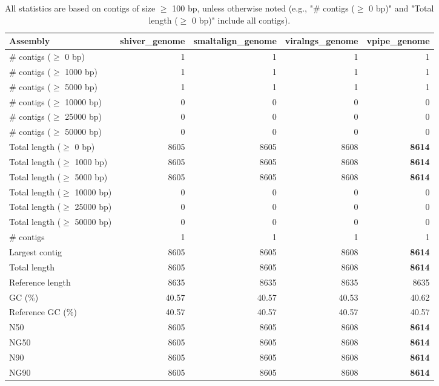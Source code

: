 \documentclass[12pt,a4paper]{article}
\begin{document}
\begin{table}[ht]
\begin{center}
\caption{All statistics are based on contigs of size $\geq$ 100 bp, unless otherwise noted (e.g., "\# contigs ($\geq$ 0 bp)" and "Total length ($\geq$ 0 bp)" include all contigs).}
\begin{tabular}{|l*{4}{|r}|}
\hline
Assembly & shiver\_genome & smaltalign\_genome & viralngs\_genome & vpipe\_genome \\ \hline
\# contigs ($\geq$ 0 bp) & 1 & 1 & 1 & 1 \\ \hline
\# contigs ($\geq$ 1000 bp) & 1 & 1 & 1 & 1 \\ \hline
\# contigs ($\geq$ 5000 bp) & 1 & 1 & 1 & 1 \\ \hline
\# contigs ($\geq$ 10000 bp) & 0 & 0 & 0 & 0 \\ \hline
\# contigs ($\geq$ 25000 bp) & 0 & 0 & 0 & 0 \\ \hline
\# contigs ($\geq$ 50000 bp) & 0 & 0 & 0 & 0 \\ \hline
Total length ($\geq$ 0 bp) & 8605 & 8605 & 8608 & {\bf 8614} \\ \hline
Total length ($\geq$ 1000 bp) & 8605 & 8605 & 8608 & {\bf 8614} \\ \hline
Total length ($\geq$ 5000 bp) & 8605 & 8605 & 8608 & {\bf 8614} \\ \hline
Total length ($\geq$ 10000 bp) & 0 & 0 & 0 & 0 \\ \hline
Total length ($\geq$ 25000 bp) & 0 & 0 & 0 & 0 \\ \hline
Total length ($\geq$ 50000 bp) & 0 & 0 & 0 & 0 \\ \hline
\# contigs & 1 & 1 & 1 & 1 \\ \hline
Largest contig & 8605 & 8605 & 8608 & {\bf 8614} \\ \hline
Total length & 8605 & 8605 & 8608 & {\bf 8614} \\ \hline
Reference length & 8635 & 8635 & 8635 & 8635 \\ \hline
GC (\%) & 40.57 & 40.57 & 40.53 & 40.62 \\ \hline
Reference GC (\%) & 40.57 & 40.57 & 40.57 & 40.57 \\ \hline
N50 & 8605 & 8605 & 8608 & {\bf 8614} \\ \hline
NG50 & 8605 & 8605 & 8608 & {\bf 8614} \\ \hline
N90 & 8605 & 8605 & 8608 & {\bf 8614} \\ \hline
NG90 & 8605 & 8605 & 8608 & {\bf 8614} \\ \hline

\end{tabular}
\end{center}
\end{table}
\end{document}
